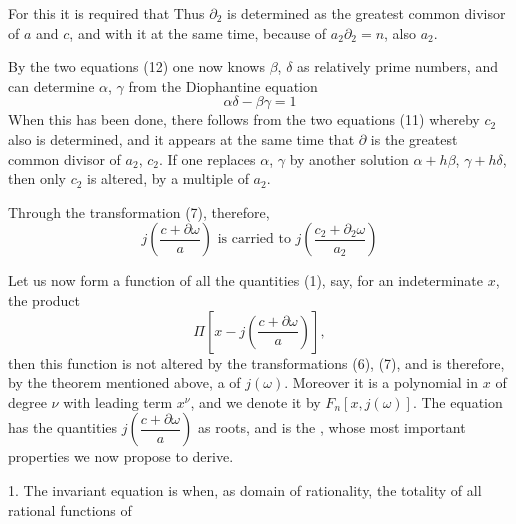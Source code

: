 For this it is required that
Thus $\partial_2$ is determined as the greatest common
divisor of $a$ and $c$, and with it at the same time, because of $a_2\partial_2 = n$, also $a_2$.

By the two equations (12) one now knows $\beta$, $\delta$
as relatively prime numbers, and can determine $\alpha$, $\gamma$ from the Diophantine
equation
\[
\alpha\delta - \beta\gamma = 1
\]
When this has been done, there follows from the two
equations (11)
whereby $c_2$ also is determined, and it appears at the same time that $\partial$
is the greatest common divisor of $a_2$, $c_2$. If one replaces
$\alpha$, $\gamma$ by another solution $\alpha + h\beta$, $\gamma + h\delta$, then only
$c_2$ is altered, by a multiple of $a_2$.

Through the transformation (7), therefore,
\[
j\left(\frac{c+\partial\omega}{a}\right) \text{ is carried to } j\left(\frac{c_2+\partial_2\omega}{a_2}\right)
\]

Let us now form a  function of all the
quantities (1), say, for an indeterminate $x$, the product
\[
\Pi\left[x - j\left(\frac{c+\partial\omega}{a}\right)\right],
\]
then this function is not altered by the transformations
(6), (7), and is therefore, by the theorem mentioned above, a  of $j(\omega)$. Moreover it is a polynomial
in $x$ of degree $\nu$ with leading term $x^{\nu}$, and
we denote it by $F_n[x, j(\omega)]$. The equation
has the quantities $j\left(\dfrac{c+\partial\omega}{a}\right)$ as roots, and is the ,
whose most important properties we now propose to derive.

1. The invariant equation is  when, as domain of rationality, the totality of all rational functions of
